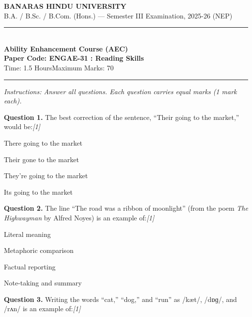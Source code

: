 \documentclass[11pt,a4paper]{article}
\newcommand{\pts}[1]{\hfill   \textit{[#1]}}
\begin{document}
\begin{center}
  {\large\bfseries BANARAS HINDU UNIVERSITY}\\[2pt]
  {\normalsize B.A. / B.Sc. / B.Com. (Hons.) --- Semester III Examination, 2025-26 (NEP)}\\[6pt]
  \rule{0.8\linewidth}{0.5pt}\\[6pt]
  {\large\bfseries Ability Enhancement Course (AEC)}\\[4pt]
  {\large\bfseries Paper Code: ENGAE-31 : Reading Skills}\\[4pt]
  {\normalsize Time: 1.5 Hours\hfill Maximum Marks: 70}
\end{center}

\rule{\linewidth}{0.4pt}

\smallskip



\noindent   \textit{Instructions: Answer all questions. Each question carries equal marks (1 mark each).}

\bigskip




\noindent   \textbf{Question 1.} The best correction of the sentence, ``Their going to the market,'' would be:\pts{1}

\begin{parts}
  \item There going to the market
  \item Their gone to the market
  \item They're going to the market
  \item Its going to the market
\end{parts}

\medskip




\noindent   \textbf{Question 2.} The line ``The road was a ribbon of moonlight'' (from the poem   \textit{The Highwayman} by Alfred Noyes) is an example of:\pts{1}

\begin{parts}
  \item Literal meaning
  \item Metaphoric comparison
  \item Factual reporting
  \item Note-taking and summary
\end{parts}

\medskip




\noindent   \textbf{Question 3.} Writing the words ``cat,'' ``dog,'' and ``run'' as /kæt/, /dɒɡ/, and /rʌn/ is an example of:\pts{1}
\end{document}
